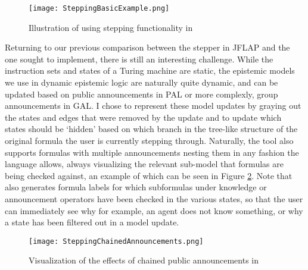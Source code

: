 \begin{figure}[H]
	\texttt{[image: SteppingBasicExample.png]}
	\caption{Illustration of using stepping functionality in \cname{}}
	\label{fig:stepperBasic}
\end{figure}


Returning to our previous comparison between the stepper in JFLAP and the one sought to implement, there is still an interesting challenge. While the instruction sets and states of a Turing machine are static, the epistemic models we use in dynamic epistemic logic are naturally quite dynamic, and can be updated based on public announcements in PAL or more complexly, group announcements in GAL. I chose to represent these model updates by graying out the states and edges that were removed by the update and to update which states should be `hidden' based on which branch in the tree-like structure of the original formula the user is currently stepping through. Naturally, the tool also supports formulas with multiple announcements nesting them in any fashion the language allows, always visualizing the relevant sub-model that formulas are being checked against, an example of which can be seen in Figure \ref{fig:stepperUpdates}. Note that \cname{} also generates formula labels for which subformulas under knowledge or announcement operators have been checked in the various states, so that the user can immediately see why for example, an agent does not know something, or why a state has been filtered out in a model update.

\begin{figure}[H]
	\texttt{[image: SteppingChainedAnnouncements.png]}
	\caption{Visualization of the effects of chained public announcements in \cname{}}
	\label{fig:stepperUpdates}
\end{figure}
 





